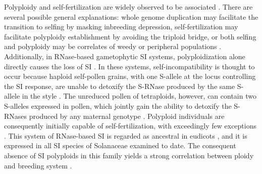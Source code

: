 Polyploidy and self-fertilization are widely observed to be associated \citep{stebbins1950}.
There are several possible general explanations: whole genome duplication may facilitate the transition to selfing by masking inbreeding depression, self-fertilization may facilitate polyploidy establishment by avoiding the triploid bridge, or both selfing and polyploidy may be correlates of weedy or peripheral populations \citep{ramsey_1998, barringer2007, barrett2008, husband2008}.
Additionally, in RNase-based gametophytic SI systems, polyploidization alone directly causes the loss of SI \citep{stout1942, lewis1947}. %
In these systems, self-incompatibility is thought to occur because haploid self-pollen grains, with one S-allele at the locus controlling the SI response, are unable to detoxify the S-RNase produced by the same S-allele in the style . 
The unreduced pollen of tetraploids, however, can contain two S-alleles expressed in pollen, which jointly gain the ability to detoxify the S-RNases produced by any maternal genotype \citep{entani1999, tsukamoto2005, kubo2010}.
Polyploid individuals are consequently initially capable of self-fertilization, with exceedingly few exceptions \citep{hauck_2002, nunes_2006}.
This system of RNase-based SI is regarded as ancestral in eudicots \citep{igic_2001,steinbachs_2002}, and it is expressed in all SI species of Solanaceae examined to date.
The consequent absence of SI polyploids in this family yields a strong correlation between ploidy and breeding system \citep{robertson_2011}.

